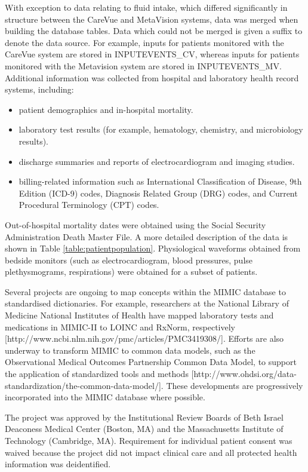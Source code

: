 \documentclass[english]{article}
\begin{document}
With exception to data relating to fluid intake, which differed significantly in structure between the CareVue and MetaVision systems, data was merged when building the database tables. Data which could not be merged is given a suffix to denote the data source. For example, inputs for patients monitored with the CareVue system are stored in INPUTEVENTS\_CV, whereas inputs for patients monitored with the Metavision system are stored in INPUTEVENTS\_MV. Additional information was collected from hospital and laboratory health record systems, including:
\begin{itemize}
  \item patient demographics and in-hospital mortality.
  \item laboratory test results (for example, hematology, chemistry, and microbiology results).
  \item discharge summaries and reports of electrocardiogram and imaging studies.
  \item billing-related information such as International Classification of Disease, 9th Edition (ICD-9) codes, Diagnosis Related Group (DRG) codes, and Current Procedural Terminology (CPT) codes.
\end{itemize}
Out-of-hospital mortality dates were obtained using the Social Security Administration Death Master File. A more detailed description of the data is shown in Table \ref{table:patientpopulation}. Physiological waveforms obtained from bedside monitors (such as electrocardiogram, blood pressures, pulse plethysmograms, respirations) were obtained for a subset of patients. 

Several projects are ongoing to map concepts within the MIMIC database to standardised dictionaries. For example, researchers at the National Library of Medicine National Institutes of Health have mapped laboratory tests and medications in MIMIC-II to LOINC and RxNorm, respectively [http://www.ncbi.nlm.nih.gov/pmc/articles/PMC3419308/]. Efforts are also underway to transform MIMIC to common data models, such as the Observational Medical Outcomes Partnership Common Data Model, to support the application of standardized tools and methods [http://www.ohdsi.org/data-standardization/the-common-data-model/]. These developments are progressively incorporated into the MIMIC database where possible.

The project was approved by the Institutional Review Boards of Beth Israel Deaconess Medical Center (Boston, MA) and the Massachusetts Institute of Technology (Cambridge, MA). Requirement for individual patient consent was waived because the project did not impact clinical care and all protected health information was deidentified.
\end{document}
